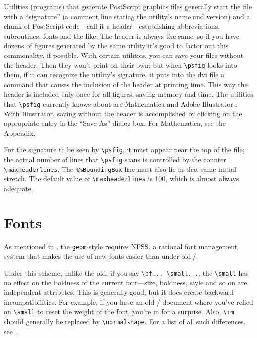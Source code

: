 Utilities (programs) that generate PostScript graphics files generally
start the file with a ``signature'' (a comment line stating the
utility's name and version) and a chunk of PostScript code---call it a
header---establishing abbreviations, subroutines, fonts and the like.
The header is always the same, so if you have dozens of figures
generated by the same utility it's good to factor out this
commonality, if possible.  With certain utilities, you can save your
files without the header.  Then they won't print on their own; but
when \verb+\psfig+ looks into them, if it can recognize the utility's
signature, it puts into the dvi file a command that causes the
inclusion of the header at printing time.  This way the header is
included only once for all figures, saving memory and time.  The
utilities that \verb+\psfig+ currently knows about are Mathematica
\cite{wolfram} and Adobe Illustrator \cite{illustrator}.  With
Illustrator, saving without the header is accomplished by clicking on
the appropriate entry in the ``Save As'' dialog box.  For Mathematica,
see the Appendix.

\begin{wizard}
For the signature to be seen by \verb+\psfig+, it must appear near the
top of the file; the actual number of lines that \verb+\psfig+ scans
is controlled by the counter \verb+\maxheaderlines+.  The
\verb+%%BoundingBox+ line must also lie in that same initial stretch.
The default value of \verb+\maxheaderlines+ is 100, which is almost
always adequate.
\end{wizard}

\section{Fonts}
As mentioned in , the \verb+geom+ style
requires NFSS,
a rational font management system that makes the use of new
fonts easier than under old \latex/.

Under this scheme, unlike the old, if you say \verb+\bf... \small...+,
the \verb+\small+ has no effect on the boldness of the current
font---size, boldness, style and so on are independent attributes.
This is generally good, but it does create backward incompatibilities.
For example, if you have an old \latex/ document where you've relied
on \verb+\small+ to reset the weight of the font, you're in for a
surprise.  Also, \verb+\rm+ should generally be replaced by
\verb+\normalshape+.  For a list of all such differences, see
\cite{amslatex}.

